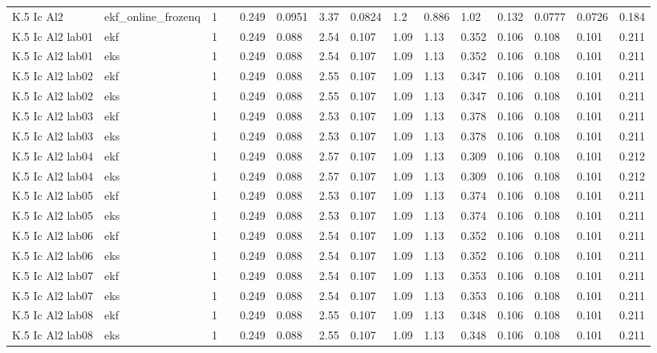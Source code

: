 \begin{table}[t]
\begin{tabular}{lllllllllllllll}
K.5 Ic Al2 & ekf\_online\_frozenq & 1 &  & 0.249 & 0.0951 & 3.37 & 0.0824 & 1.2 & 0.886 & 1.02 & 0.132 & 0.0777 & 0.0726 & 0.184 \\
K.5 Ic Al2 lab01 & ekf & 1 &  & 0.249 & 0.088 & 2.54 & 0.107 & 1.09 & 1.13 & 0.352 & 0.106 & 0.108 & 0.101 & 0.211 \\
K.5 Ic Al2 lab01 & eks & 1 &  & 0.249 & 0.088 & 2.54 & 0.107 & 1.09 & 1.13 & 0.352 & 0.106 & 0.108 & 0.101 & 0.211 \\
K.5 Ic Al2 lab02 & ekf & 1 &  & 0.249 & 0.088 & 2.55 & 0.107 & 1.09 & 1.13 & 0.347 & 0.106 & 0.108 & 0.101 & 0.211 \\
K.5 Ic Al2 lab02 & eks & 1 &  & 0.249 & 0.088 & 2.55 & 0.107 & 1.09 & 1.13 & 0.347 & 0.106 & 0.108 & 0.101 & 0.211 \\
K.5 Ic Al2 lab03 & ekf & 1 &  & 0.249 & 0.088 & 2.53 & 0.107 & 1.09 & 1.13 & 0.378 & 0.106 & 0.108 & 0.101 & 0.211 \\
K.5 Ic Al2 lab03 & eks & 1 &  & 0.249 & 0.088 & 2.53 & 0.107 & 1.09 & 1.13 & 0.378 & 0.106 & 0.108 & 0.101 & 0.211 \\
K.5 Ic Al2 lab04 & ekf & 1 &  & 0.249 & 0.088 & 2.57 & 0.107 & 1.09 & 1.13 & 0.309 & 0.106 & 0.108 & 0.101 & 0.212 \\
K.5 Ic Al2 lab04 & eks & 1 &  & 0.249 & 0.088 & 2.57 & 0.107 & 1.09 & 1.13 & 0.309 & 0.106 & 0.108 & 0.101 & 0.212 \\
K.5 Ic Al2 lab05 & ekf & 1 &  & 0.249 & 0.088 & 2.53 & 0.107 & 1.09 & 1.13 & 0.374 & 0.106 & 0.108 & 0.101 & 0.211 \\
K.5 Ic Al2 lab05 & eks & 1 &  & 0.249 & 0.088 & 2.53 & 0.107 & 1.09 & 1.13 & 0.374 & 0.106 & 0.108 & 0.101 & 0.211 \\
K.5 Ic Al2 lab06 & ekf & 1 &  & 0.249 & 0.088 & 2.54 & 0.107 & 1.09 & 1.13 & 0.352 & 0.106 & 0.108 & 0.101 & 0.211 \\
K.5 Ic Al2 lab06 & eks & 1 &  & 0.249 & 0.088 & 2.54 & 0.107 & 1.09 & 1.13 & 0.352 & 0.106 & 0.108 & 0.101 & 0.211 \\
K.5 Ic Al2 lab07 & ekf & 1 &  & 0.249 & 0.088 & 2.54 & 0.107 & 1.09 & 1.13 & 0.353 & 0.106 & 0.108 & 0.101 & 0.211 \\
K.5 Ic Al2 lab07 & eks & 1 &  & 0.249 & 0.088 & 2.54 & 0.107 & 1.09 & 1.13 & 0.353 & 0.106 & 0.108 & 0.101 & 0.211 \\
K.5 Ic Al2 lab08 & ekf & 1 &  & 0.249 & 0.088 & 2.55 & 0.107 & 1.09 & 1.13 & 0.348 & 0.106 & 0.108 & 0.101 & 0.211 \\
K.5 Ic Al2 lab08 & eks & 1 &  & 0.249 & 0.088 & 2.55 & 0.107 & 1.09 & 1.13 & 0.348 & 0.106 & 0.108 & 0.101 & 0.211 \\

\end{tabular}
\end{table}
